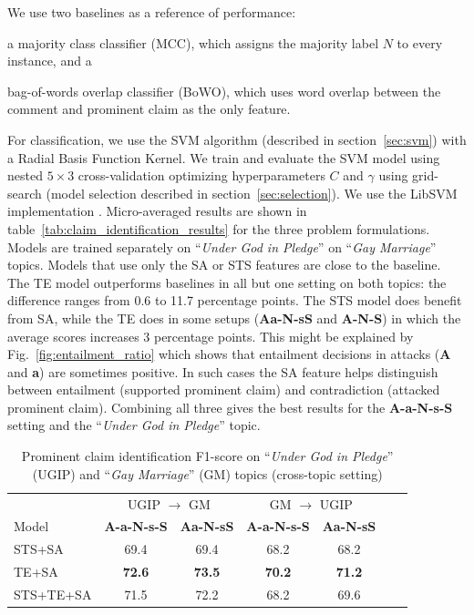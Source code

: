 We use two baselines as a reference of performance: 
\begin{enumerate*}[label=(\arabic*)]
\item a majority class classifier (MCC), which assigns the majority label $N$ to every instance, and a 
\item bag-of-words overlap classifier (BoWO), which uses word overlap between
	the comment and prominent claim as the only feature.
\end{enumerate*}
For classification, we use the SVM algorithm (described in section~\ref{sec:svm}) with a 
Radial Basis Function Kernel. 
We train and evaluate the SVM model using nested $5 \times 3$ cross-validation
 optimizing hyperparameters $C$ and $\gamma$ using
grid-search (model selection described in section~\ref{sec:selection}).
We use the LibSVM implementation \citep{chang2011libsvm}. 
Micro-averaged results are shown in table~\ref{tab:claim_identification_results}
for the three problem formulations. 
Models are trained separately on ``\emph{Under God in Pledge}'' on ``\emph{Gay
Marriage}'' topics. 
Models that use only the SA or STS features are close to the baseline. 
The TE model outperforms baselines in all but one setting on both topics: 
the difference ranges from 0.6 to 11.7 percentage points. 
The STS model does benefit from SA, while the TE does in some setups 
(\textbf{Aa-N-sS} and \textbf{A-N-S}) in which the average scores increases 3 percentage points. 
This might be explained by Fig.~\ref{fig:entailment_ratio} which shows that 
entailment decisions in attacks (\textbf{A} and \textbf{a}) are sometimes positive. 
In such cases the SA feature helps distinguish between entailment (supported prominent claim) 
and contradiction (attacked prominent claim). 
Combining all three gives the best results for the \textbf{A-a-N-s-S} setting
and the ``\emph{Under God in Pledge}'' topic.

\begin{table}
\centering
{\small
\begin{tabular}{@{}l ccc ccc@{}}
\toprule
& \multicolumn{2}{c}{UGIP $\to$ GM} & \multicolumn{2}{c}{GM $\to$ UGIP}\\
\cmidrule(lr){2-3}\cmidrule(lr){4-5}
Model & \textbf{A-a-N-s-S} & \textbf{Aa-N-sS}
      & \textbf{A-a-N-s-S} & \textbf{Aa-N-sS} \\
\midrule
STS+SA & 69.4 & 69.4 & 68.2 & 68.2   \\
TE+SA & \textbf{72.6 }& \textbf{73.5} & \textbf{70.2} & \textbf{71.2}  \\
STS+TE+SA  & 71.5 & 72.2 & 68.2 & 69.6  \\
\bottomrule
\end{tabular}}
	\caption{Prominent claim identification F1-score on ``\emph{Under God
	in Pledge}'' (UGIP) and ``\emph{Gay Marriage}'' (GM) topics (cross-topic
setting)}
\label{tab:claim_identification_crosstopic}
\end{table}

